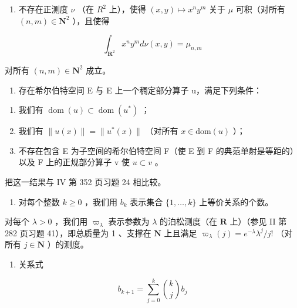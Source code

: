 \begin{enumerate}
\def\labelenumi{\alph{enumi})}
\setcounter{enumi}{4}
\tightlist
\item
  不存在正测度 \(\nu\) （在 \(R^{2}\) 上），使得 \((x,y)\mapsto x^{n}y^{m}\) 关于 \(\mu\) 可积（对所有 \((n,m)\in\mathbf{N}^{2}\) ），且使得
\end{enumerate}

\[
\int_ {\mathbf {R} ^ {2}} x ^ {n} y ^ {m} d \nu (x, y) = \mu_ {n, m}
\]

对所有 \((n,m)\in\mathbf{N}^{2}\) 成立。

\begin{enumerate}
\def\labelenumi{\alph{enumi})}
\setcounter{enumi}{5}
\tightlist
\item
  存在希尔伯特空间 E 与 E 上一个稠定部分算子 u，满足下列条件：
\end{enumerate}

\begin{enumerate}
\def\labelenumi{(\roman{enumi})}
\item
  我们有 \(\operatorname{dom}(u) \subset \operatorname{dom}(u^*)\) ；
\item
  我们有 \(\|u(x)\|=\|u^{*}(x)\|\) （对所有 \(x\in\mathrm{dom}(u)\) ）；
\item
  不存在包含 E 为子空间的希尔伯特空间 F（使 E 到 F 的典范单射是等距的）以及 F 上的正规部分算子 v 使 \(u \subset v\) 。
\end{enumerate}

把这一结果与 IV 第 352 页习题 24 相比较。

\begin{enumerate}
\def\labelenumi{\arabic{enumi})}
\setcounter{enumi}{27}
\tightlist
\item
  对每个整数 \(k \geqslant 0\) ，我们用 \(b_k\) 表示集合 \(\{1, \ldots, k\}\) 上等价关系的个数。
\end{enumerate}

对每个 \(\lambda > 0\) ，我们用 \(\varpi_{\lambda}\) 表示参数为 \(\lambda\) 的泊松测度（在 \(\mathbf{R}\) 上）（参见 II 第 282 页习题 41），即总质量为 1 、支撑在 \(\mathbf{N}\) 上且满足 \(\varpi_{\lambda}(j) = e^{-\lambda} \lambda^{j} / j!\) （对所有 \(j \in \mathbf{N}\) ）的测度。

\begin{enumerate}
\def\labelenumi{\alph{enumi})}
\tightlist
\item
  关系式
\end{enumerate}

\[
b _ {k + 1} = \sum_ {j = 0} ^ {k} {\binom {k} {j}} b _ {j}
\]

